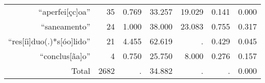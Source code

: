\begin{table}[!htbp]
\begin{tabular}{rrrrrrr}
  ``aperfei{[}çc{]}oa''                                     & 35  & 0.769 & 33.257 & 19.029 & 0.141 & 0.000 \T \B \\
  ``saneamento''                                            & 24  & 1.000 & 38.000 & 23.083 & 0.755 & 0.317 \T \B \\
  ``res{[}íi{]}duo(.)*s{[}óo{]}lido''                       & 21  & 4.455 & 62.619 & .      & 0.429 & 0.045 \T \B \\
  ``conclus{[}ãa{]}o''                                      & 4   & 0.750 & 25.750 & 8.000  & 0.276 & 0.157 \T \B \\
  \hline
  Total                                                     & 2682& .     & 34.882 & .      & .     & 0.000 \T \B \\
   \hline

   \hline
  \end{tabular}
\end{table}